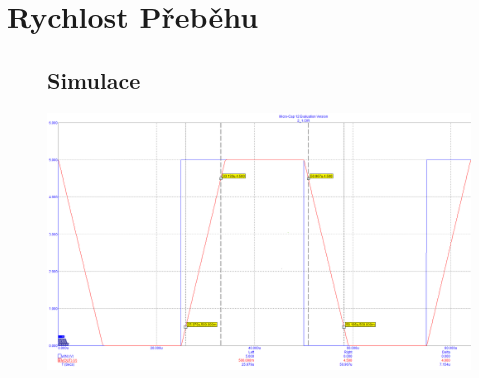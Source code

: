 \documentclass{article}
\begin{document}
\section*{Rychlost Přeběhu}
\begin{figure}[H]
  \begin{minipage}[t]{0.5\textwidth}
    \subsection*{Simulace}
    \includegraphics[width=\textwidth]{PC/Tranzientni/rychlost_prebehu.png}
  \end{minipage}
  \hfill
  \begin{minipage}[t]{0.5\textwidth}

\end{minipage}
\end{figure}
\end{document}
